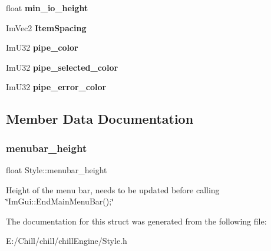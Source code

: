 \begin{DoxyCompactItemize}
\item 
\mbox{\label{struct_style_a4355541bd6914ad241bd4462604e9625}} 
float {\bfseries min\+\_\+io\+\_\+height}
\item 
\mbox{\label{struct_style_a287b57ed9369e4683702f862a9aaf985}} 
Im\+Vec2 {\bfseries Item\+Spacing}
\item 
\mbox{\label{struct_style_a3e42c2fe48f73bef052b432639edb0cf}} 
Im\+U32 {\bfseries pipe\+\_\+color}
\item 
\mbox{\label{struct_style_aa4040135b119784e3370909cadc8446b}} 
Im\+U32 {\bfseries pipe\+\_\+selected\+\_\+color}
\item 
\mbox{\label{struct_style_acc73acbaf48f7eb3e475a3a7bb1907f4}} 
Im\+U32 {\bfseries pipe\+\_\+error\+\_\+color}
\end{DoxyCompactItemize}


\subsection{Member Data Documentation}
\mbox{\label{struct_style_a5947362709e6bf98fdbce85e79ed9e62}} 
\subsubsection{\texorpdfstring{menubar\+\_\+height}{menubar\_height}}
{\footnotesize\ttfamily float Style\+::menubar\+\_\+height}

Height of the menu bar, needs to be updated before calling \char`\"{}\+Im\+Gui\+::\+End\+Main\+Menu\+Bar();\char`\"{} 

The documentation for this struct was generated from the following file\+:\begin{DoxyCompactItemize}
\item 
E\+:/\+Chill/chill/chill\+Engine/Style.\+h\end{DoxyCompactItemize}
